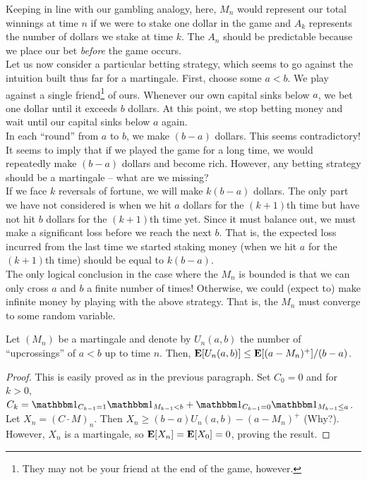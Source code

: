 Keeping in line with our gambling analogy, here, $M_n$ would represent our total winnings at time $n$ if we were to stake one dollar in the game and $A_k$ represents the number of dollars we stake at time $k$. The $A_n$ should be predictable because we place our bet \textit{before} the game occurs.\\

Let us now consider a particular betting strategy, which seems to go against the intuition built thus far for a martingale. First, choose some $a<b$. We play against a single friend\footnote{They may not be your friend at the end of the game, however.} of ours. Whenever our own capital sinks below $a$, we bet one dollar until it exceeds $b$ dollars. At this point, we stop betting money and wait until our capital sinks below $a$ again.\\
In each ``round'' from $a$ to $b$, we make $(b-a)$ dollars. This seems contradictory! It seems to imply that if we played the game for a long time, we would repeatedly make $(b-a)$ dollars and become rich. However, any betting strategy should be a martingale -- what are we missing?\\
If we face $k$ reversals of fortune, we will make $k(b-a)$ dollars. The only part we have not considered is when we hit $a$ dollars for the $(k+1)$th time but have not hit $b$ dollars for the $(k+1)$th time yet. Since it must balance out, we must make a significant loss before we reach the next $b$. That is, the expected loss incurred from the last time we started staking money (when we hit $a$ for the $(k+1)$th time) should be equal to $k(b-a)$.\\
The only logical conclusion in the case where the $M_n$ is bounded is that we can only cross $a$ and $b$ a finite number of times! Otherwise, we could (expect to) make infinite money by playing with the above strategy. That is, the $M_n$ must converge to some random variable.

\begin{lemma}
	\label{doob's upcrossing lemma}
	Let $(M_n)$ be a martingale and denote by $U_n(a,b)$ the number of ``upcrossings'' of $a<b$ up to time $n$. Then, $\textbf{E}[U_n(a,b)] \leq \textbf{E}[(a-M_n)^+]/(b-a)$.
\end{lemma}
\begin{proof}
	This is easily proved as in the previous paragraph. Set $C_0 = 0$ and for $k>0$, $C_k = \indic_{C_{k-1}=1}\indic_{M_{k-1} < b} + \indic_{C_{k-1}=0}\indic_{M_{k-1} \leq a}$. Let $X_n = (C\cdot M)_n$. Then $X_n \geq (b-a)U_n(a,b) - (a-M_n)^+$ (Why?). However, $X_n$ is a martingale, so $\textbf{E}[X_n] = \textbf{E}[X_0] = 0$, proving the result.
\end{proof}

